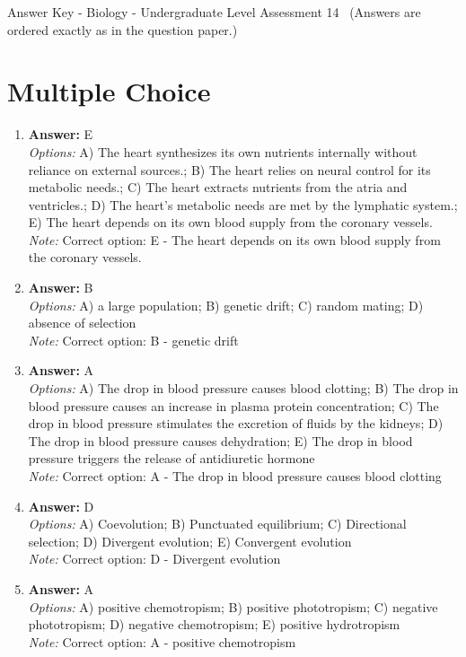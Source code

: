 \documentclass[12pt]{article}
\begin{document}
\begin{center}
Answer Key - Biology - Undergraduate Level Assessment 14 \
\small (Answers are ordered exactly as in the question paper.)
\end{center}

\section*{Multiple Choice}
\begin{enumerate}[label=\arabic*.]
\item \textbf{Answer:} E
\\ \textit{Options:} A) The heart synthesizes its own nutrients internally without reliance on external sources.; B) The heart relies on neural control for its metabolic needs.; C) The heart extracts nutrients from the atria and ventricles.; D) The heart's metabolic needs are met by the lymphatic system.; E) The heart depends on its own blood supply from the coronary vessels.
\\ \textit{Note:} Correct option: E - The heart depends on its own blood supply from the coronary vessels.
\item \textbf{Answer:} B
\\ \textit{Options:} A) a large population; B) genetic drift; C) random mating; D) absence of selection
\\ \textit{Note:} Correct option: B - genetic drift
\item \textbf{Answer:} A
\\ \textit{Options:} A) The drop in blood pressure causes blood clotting; B) The drop in blood pressure causes an increase in plasma protein concentration; C) The drop in blood pressure stimulates the excretion of fluids by the kidneys; D) The drop in blood pressure causes dehydration; E) The drop in blood pressure triggers the release of antidiuretic hormone
\\ \textit{Note:} Correct option: A - The drop in blood pressure causes blood clotting
\item \textbf{Answer:} D
\\ \textit{Options:} A) Coevolution; B) Punctuated equilibrium; C) Directional selection; D) Divergent evolution; E) Convergent evolution
\\ \textit{Note:} Correct option: D - Divergent evolution
\item \textbf{Answer:} A
\\ \textit{Options:} A) positive chemotropism; B) positive phototropism; C) negative phototropism; D) negative chemotropism; E) positive hydrotropism
\\ \textit{Note:} Correct option: A - positive chemotropism
\end{enumerate}
\end{document}

